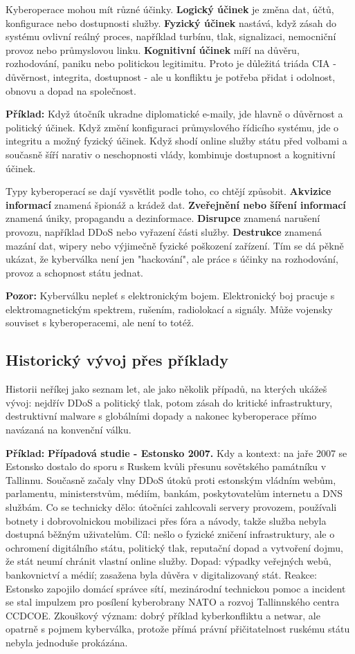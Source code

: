 \documentclass[11pt,a4paper]{article}
\newcommand{\pozor}[1]{\begin{tcolorbox}[breakable,enhanced,colback=red!7,colframe=red!30!black,boxrule=0pt,arc=1mm,left=5pt,right=5pt,top=5pt,bottom=5pt,before skip=6pt,after skip=6pt]\textbf{Pozor:} #1\end{tcolorbox}}
\newcommand{\priklad}[1]{\begin{tcolorbox}[breakable,enhanced,colback=green!7,colframe=green!30!black,boxrule=0pt,arc=1mm,left=5pt,right=5pt,top=5pt,bottom=5pt,before skip=6pt,after skip=6pt]\textbf{Příklad:} #1\end{tcolorbox}}
\begin{document}
Kyberoperace mohou mít různé účinky. \textbf{Logický účinek} je změna dat, účtů, konfigurace nebo dostupnosti služby. \textbf{Fyzický účinek} nastává, když zásah do systému ovlivní reálný proces, například turbínu, tlak, signalizaci, nemocniční provoz nebo průmyslovou linku. \textbf{Kognitivní účinek} míří na důvěru, rozhodování, paniku nebo politickou legitimitu. Proto je důležitá triáda CIA - důvěrnost, integrita, dostupnost - ale u konfliktu je potřeba přidat i odolnost, obnovu a dopad na společnost.

\priklad{Když útočník ukradne diplomatické e-maily, jde hlavně o důvěrnost a politický účinek. Když změní konfiguraci průmyslového řídicího systému, jde o integritu a možný fyzický účinek. Když shodí online služby státu před volbami a současně šíří narativ o neschopnosti vlády, kombinuje dostupnost a kognitivní účinek.}

Typy kyberoperací se dají vysvětlit podle toho, co chtějí způsobit. \textbf{Akvizice informací} znamená špionáž a krádež dat. \textbf{Zveřejnění nebo šíření informací} znamená úniky, propagandu a dezinformace. \textbf{Disrupce} znamená narušení provozu, například DDoS nebo vyřazení části služby. \textbf{Destrukce} znamená mazání dat, wipery nebo výjimečně fyzické poškození zařízení. Tím se dá pěkně ukázat, že kyberválka není jen "hackování", ale práce s účinky na rozhodování, provoz a schopnost státu jednat.

\pozor{Kyberválku nepleť s elektronickým bojem. Elektronický boj pracuje s elektromagnetickým spektrem, rušením, radiolokací a signály. Může vojensky souviset s kyberoperacemi, ale není to totéž.}

\subsection*{Historický vývoj přes příklady}
Historii neříkej jako seznam let, ale jako několik případů, na kterých ukážeš vývoj: nejdřív DDoS a politický tlak, potom zásah do kritické infrastruktury, destruktivní malware s globálními dopady a nakonec kyberoperace přímo navázaná na konvenční válku.

\priklad{\textbf{Případová studie - Estonsko 2007.} Kdy a kontext: na jaře 2007 se Estonsko dostalo do sporu s Ruskem kvůli přesunu sovětského památníku v Tallinnu. Současně začaly vlny DDoS útoků proti estonským vládním webům, parlamentu, ministerstvům, médiím, bankám, poskytovatelům internetu a DNS službám. Co se technicky dělo: útočníci zahlcovali servery provozem, používali botnety i dobrovolnickou mobilizaci přes fóra a návody, takže služba nebyla dostupná běžným uživatelům. Cíl: nešlo o fyzické zničení infrastruktury, ale o ochromení digitálního státu, politický tlak, reputační dopad a vytvoření dojmu, že stát neumí chránit vlastní online služby. Dopad: výpadky veřejných webů, bankovnictví a médií; zasažena byla důvěra v digitalizovaný stát. Reakce: Estonsko zapojilo domácí správce sítí, mezinárodní technickou pomoc a incident se stal impulzem pro posílení kyberobrany NATO a rozvoj Tallinnského centra CCDCOE. Zkouškový význam: dobrý příklad kyberkonfliktu a netwar, ale opatrně s pojmem kyberválka, protože přímá právní přičitatelnost ruskému státu nebyla jednoduše prokázána.}
\end{document}
